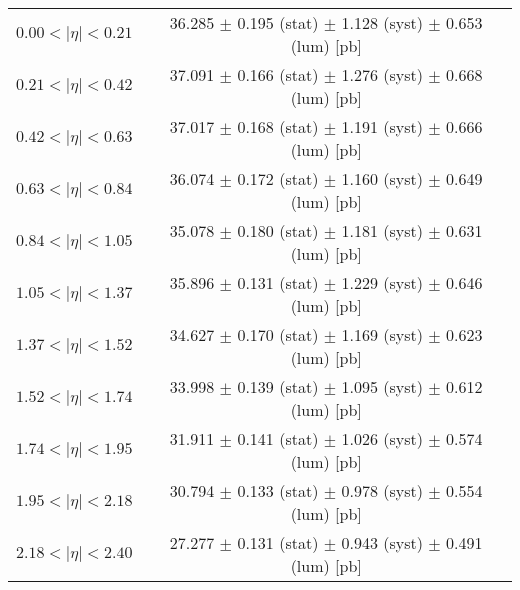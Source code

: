 \begin{tabular}{lc}
\hline
$0.00 < |\eta| <0.21$          & 36.285 $\pm$ 0.195 (stat) $\pm$ 1.128 (syst) $\pm$ 0.653 (lum) [pb]  \\
$0.21 < |\eta| <0.42$          & 37.091 $\pm$ 0.166 (stat) $\pm$ 1.276 (syst) $\pm$ 0.668 (lum) [pb]  \\
$0.42 < |\eta| <0.63$          & 37.017 $\pm$ 0.168 (stat) $\pm$ 1.191 (syst) $\pm$ 0.666 (lum) [pb]  \\
$0.63 < |\eta| <0.84$          & 36.074 $\pm$ 0.172 (stat) $\pm$ 1.160 (syst) $\pm$ 0.649 (lum) [pb]  \\
$0.84 < |\eta| <1.05$          & 35.078 $\pm$ 0.180 (stat) $\pm$ 1.181 (syst) $\pm$ 0.631 (lum) [pb]  \\
$1.05 < |\eta| <1.37$          & 35.896 $\pm$ 0.131 (stat) $\pm$ 1.229 (syst) $\pm$ 0.646 (lum) [pb]  \\
$1.37 < |\eta| <1.52$          & 34.627 $\pm$ 0.170 (stat) $\pm$ 1.169 (syst) $\pm$ 0.623 (lum) [pb]  \\
$1.52 < |\eta| <1.74$          & 33.998 $\pm$ 0.139 (stat) $\pm$ 1.095 (syst) $\pm$ 0.612 (lum) [pb]  \\
$1.74 < |\eta| <1.95$          & 31.911 $\pm$ 0.141 (stat) $\pm$ 1.026 (syst) $\pm$ 0.574 (lum) [pb]  \\
$1.95 < |\eta| <2.18$          & 30.794 $\pm$ 0.133 (stat) $\pm$ 0.978 (syst) $\pm$ 0.554 (lum) [pb]  \\
$2.18 < |\eta| <2.40$          & 27.277 $\pm$ 0.131 (stat) $\pm$ 0.943 (syst) $\pm$ 0.491 (lum) [pb]  \\
\hline
\end{tabular}
